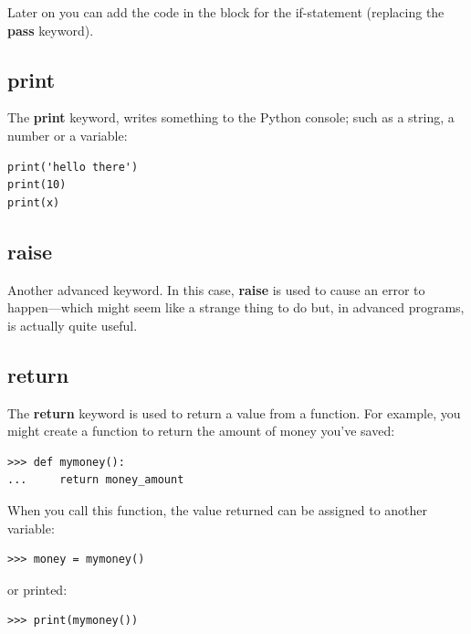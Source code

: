 \noindent
Later on you can add the code in the block for the if-statement (replacing the \textbf{pass} keyword).

\subsection*{print}

The \textbf{print} keyword, writes something to the Python console; such as a string, a number or a variable:

\begin{listing}
\begin{verbatim}
print('hello there')
print(10)
print(x)
\end{verbatim}
\end{listing}

\subsection*{raise}

Another advanced keyword.  In this case, \textbf{raise} is used to cause an error to happen---which might seem like a strange thing to do but, in advanced programs, is actually quite useful.

\subsection*{return}

The \textbf{return} keyword is used to return a value from a function.  For example, you might create a function to return the amount of money you've saved:

\begin{listingignore}
\begin{verbatim}
>>> def mymoney():
...     return money_amount
\end{verbatim}
\end{listingignore}

\noindent
When you call this function, the value returned can be assigned to another variable:

\begin{listingignore}
\begin{verbatim}
>>> money = mymoney()
\end{verbatim}
\end{listingignore}

\noindent
or printed:

\begin{listingignore}
\begin{verbatim}
>>> print(mymoney())
\end{verbatim}
\end{listingignore}

